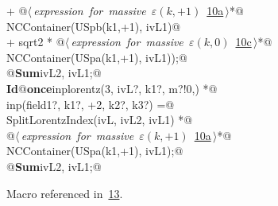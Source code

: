 \documentclass[a4paper,12pt]{amsart}
\renewcommand{\NWlink}[2]{\hyperlink{#1}{#2}}
\renewcommand{\NWtxtMacroRefIn}{Macro referenced in}
\renewcommand{\NWsep}{${\diamond}$}
\begin{document}
\begin{flushleft}
\begin{minipage}{\linewidth}
\begin{list}{}{}
\mbox{}\verb@   + @\hbox{$\langle\,${\itshape expression for massive $\varepsilon(k, +1)$}\nobreak\ {\footnotesize \NWlink{nuweb10a}{10a}}$\,\rangle$}\verb@ *@\\
\mbox{}\verb@     NCContainer(USpb(k1,+1), ivL1)@\\
\mbox{}\verb@   + sqrt2 * @\hbox{$\langle\,${\itshape expression for massive $\varepsilon(k, 0)$}\nobreak\ {\footnotesize \NWlink{nuweb10c}{10c}}$\,\rangle$}\verb@ *@\\
\mbox{}\verb@     NCContainer(USpa(k1,+1), ivL1));@\\
\mbox{}\verb@   @\hbox{\sffamily\bfseries Sum}\verb@ ivL2, ivL1;@\\
\mbox{}\verb@@\hbox{\sffamily\bfseries Id}\verb@ @\hbox{\sffamily\bfseries once}\verb@ inplorentz(3, ivL?, k1?, m?!{0,}) *@\\
\mbox{}\verb@      inp(field1?, k1?, +2, k2?, k3?) =@\\
\mbox{}\verb@   SplitLorentzIndex(ivL, ivL2, ivL1) *@\\
\mbox{}\verb@   @\hbox{$\langle\,${\itshape expression for massive $\varepsilon(k, +1)$}\nobreak\ {\footnotesize \NWlink{nuweb10a}{10a}}$\,\rangle$}\verb@ *@\\
\mbox{}\verb@   NCContainer(USpa(k1,+1), ivL1);@\\
\mbox{}\verb@   @\hbox{\sffamily\bfseries Sum}\verb@ ivL2, ivL1;@\\
\mbox{}\verb@@{\NWsep}
\end{list}
\vspace{-1.5ex}
\footnotesize
\begin{list}{}{\setlength{\itemsep}{-\parsep}\setlength{\itemindent}{-\leftmargin}}
\item \NWtxtMacroRefIn\ \NWlink{nuweb13}{13}.

\item{}
\end{list}
\end{minipage}\vspace{4ex}
\end{flushleft}
\end{document}
